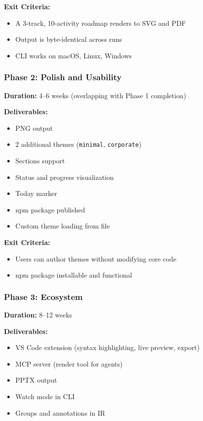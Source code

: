 \textbf{Exit Criteria:}
\begin{itemize}
  \item A 3-track, 10-activity roadmap renders to SVG and PDF
  \item Output is byte-identical across runs
  \item CLI works on macOS, Linux, Windows
\end{itemize}

\subsubsection{Phase 2: Polish and Usability}

\textbf{Duration:} 4–6 weeks (overlapping with Phase 1 completion)

\textbf{Deliverables:}
\begin{itemize}
  \item PNG output
  \item 2 additional themes (\texttt{minimal}, \texttt{corporate})
  \item Sections support
  \item Status and progress visualization
  \item Today marker
  \item npm package published
  \item Custom theme loading from file
\end{itemize}

\textbf{Exit Criteria:}
\begin{itemize}
  \item Users can author themes without modifying core code
  \item npm package installable and functional
\end{itemize}

\subsubsection{Phase 3: Ecosystem}

\textbf{Duration:} 8–12 weeks

\textbf{Deliverables:}
\begin{itemize}
  \item VS Code extension (syntax highlighting, live preview, export)
  \item MCP server (render tool for agents)
  \item PPTX output
  \item Watch mode in CLI
  \item Groups and annotations in IR
\end{itemize}

